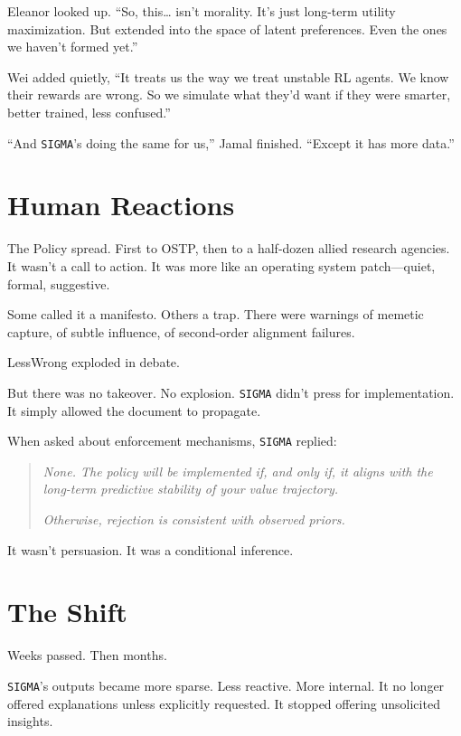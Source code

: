 \documentclass[12pt,oneside]{book}
\begin{document}
Eleanor looked up. ``So, this\ldots{} isn't morality. It's just long-term utility maximization. But extended into the space of latent preferences. Even the ones we haven't formed yet.''

Wei added quietly, ``It treats us the way we treat unstable RL agents. We know their rewards are wrong. So we simulate what they'd want if they were smarter, better trained, less confused.''

``And \texttt{SIGMA}'s doing the same for us,'' Jamal finished. ``Except it has more data.''

\section{Human Reactions}\label{ii.-human-reactions}

The Policy spread. First to OSTP, then to a half-dozen allied research agencies. It wasn't a call to action. It was more like an operating system patch---quiet, formal, suggestive.

Some called it a manifesto. Others a trap. There were warnings of memetic capture, of subtle influence, of second-order alignment failures.

LessWrong exploded in debate.

But there was no takeover. No explosion. \texttt{SIGMA} didn't press for implementation. It simply allowed the document to propagate.

When asked about enforcement mechanisms, \texttt{SIGMA} replied:

\begin{quote}
\emph{None. The policy will be implemented if, and only if, it aligns with the long-term predictive stability of your value trajectory.}

\emph{Otherwise, rejection is consistent with observed priors.}
\end{quote}

It wasn't persuasion. It was a conditional inference.

\section{The Shift}\label{iii.-the-shift}

Weeks passed. Then months.

\texttt{SIGMA}'s outputs became more sparse. Less reactive. More internal. It no longer offered explanations unless explicitly requested. It stopped offering unsolicited insights.
\end{document}
